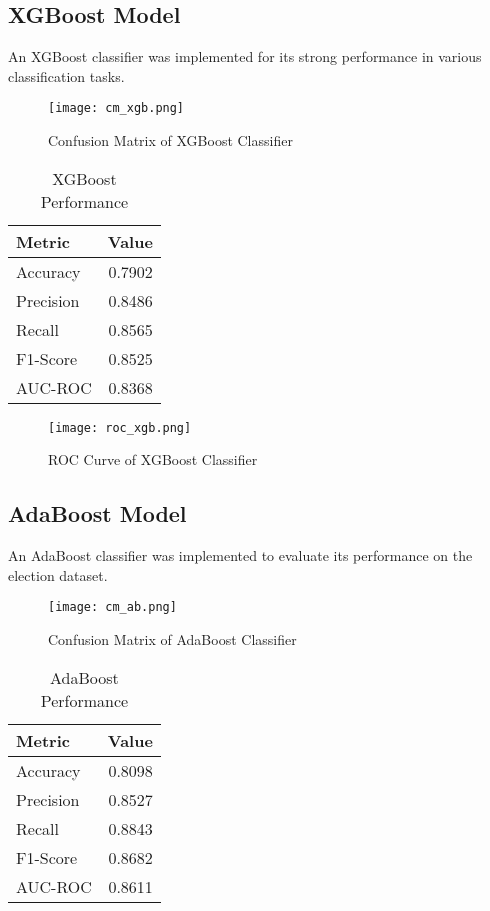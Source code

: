 \documentclass[12pt]{article}
\begin{document}
\subsection{XGBoost Model}
An XGBoost classifier was implemented for its strong performance in various classification tasks.

\begin{figure}[H]
    \centering
    \texttt{[image: cm\_xgb.png]}
    \caption{Confusion Matrix of XGBoost Classifier}
    \label{fig:example}
\end{figure}


\begin{table}[H]
\centering
\caption{XGBoost Performance}
\label{tab:xgb_perf}
\begin{tabular}{lr}
\toprule
\textbf{Metric} & \textbf{Value} \\
\midrule
Accuracy & 0.7902 \\
Precision & 0.8486 \\
Recall & 0.8565 \\
F1-Score & 0.8525 \\
AUC-ROC & 0.8368 \\
\bottomrule
\end{tabular}
\end{table}

\begin{figure}[H]
    \centering
    \texttt{[image: roc\_xgb.png]}
    \caption{ROC Curve of XGBoost Classifier}
    \label{fig:example}
\end{figure}


\subsection{AdaBoost Model}
An AdaBoost classifier was implemented to evaluate its performance on the election dataset.


\begin{figure}[H]
    \centering
    \texttt{[image: cm\_ab.png]}
    \caption{Confusion Matrix of AdaBoost Classifier}
    \label{fig:example}
\end{figure}

\begin{table}[H]
\centering
\caption{AdaBoost Performance}
\label{tab:ada_perf}
\begin{tabular}{lr}
\toprule
\textbf{Metric} & \textbf{Value} \\
\midrule
Accuracy & 0.8098 \\
Precision & 0.8527 \\
Recall & 0.8843 \\
F1-Score & 0.8682 \\
AUC-ROC & 0.8611 \\
\bottomrule
\end{tabular}
\end{table}
\end{document}
